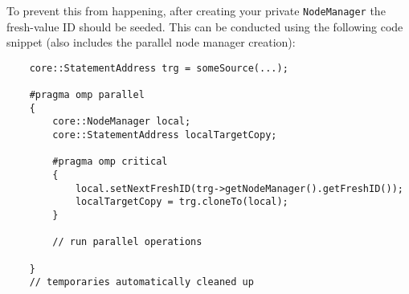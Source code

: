 To prevent this from happening, after creating your private \texttt{NodeManager} the
fresh-value ID should be seeded. This can be conducted using the following code
snippet (also includes the parallel node manager creation):
\begin{lstlisting}
	core::StatementAddress trg = someSource(...);
	
	#pragma omp parallel
	{
		core::NodeManager local;
		core::StatementAddress localTargetCopy;

		#pragma omp critical
		{
			local.setNextFreshID(trg->getNodeManager().getFreshID());
			localTargetCopy = trg.cloneTo(local);
		}
	
		// run parallel operations

	}
	// temporaries automatically cleaned up
\end{lstlisting}


